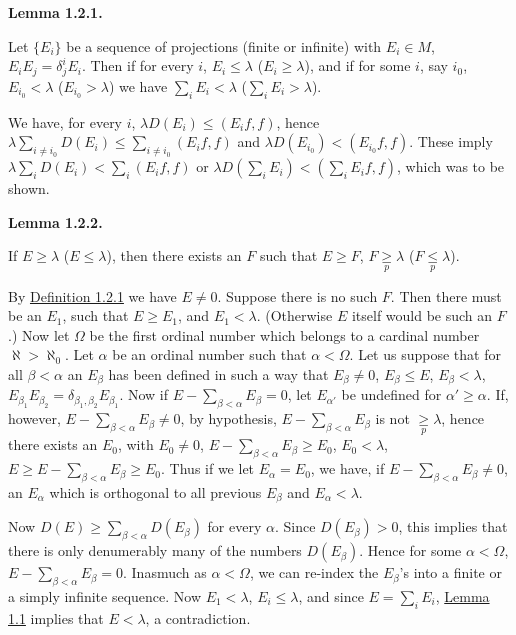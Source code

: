 \documentclass[twoside,leqno]{article}
\newcommand{\StatementTarget}[1]{\phantomsection\hypertarget{stmt:#1}{}}
\newcommand{\StatementRef}[2]{\hyperlink{stmt:#1}{#2}}
\newenvironment{statement}[2]{%
  \par\medskip
  \noindent\StatementTarget{#1}\hspace*{\parindent}\textbf{#2.}\ \itshape\ignorespaces
}{\par}
\begin{document}
\begin{statement}{lemma:1.2.1}{Lemma 1.2.1}
Let $\{E_i\}$ be a sequence of projections (finite or infinite) with
$E_i\in M$, $E_iE_j=\delta_j^iE_i$. Then if for every $i$, $E_i\leq\lambda$
($E_i\geq\lambda$), and if for some $i$, say $i_0$, $E_{i_0}<\lambda$
($E_{i_0}>\lambda$) we have $\sum_iE_i<\lambda$ ($\sum_iE_i>\lambda$).
\end{statement}

We have, for every $i$, $\lambda D(E_i)\leq(E_if,f)$, hence
$\lambda\sum_{i\ne i_0}D(E_i)\leq\sum_{i\ne i_0}(E_if,f)$ and
$\lambda D(E_{i_0})<(E_{i_0}f,f)$. These imply
$\lambda\sum_iD(E_i)<\sum_i(E_if,f)$ or
$\lambda D(\sum_iE_i)<(\sum_iE_if,f)$, which was to be shown.

\begin{statement}{lemma:1.2.2}{Lemma 1.2.2}
If $E\geq\lambda$ ($E\leq\lambda$), then there exists an $F$ such that
$E\geq F$, $F\mathrel{\underset p\geq}\lambda$ ($F\mathrel{\underset p\leq}\lambda$).
\end{statement}

By \StatementRef{definition:1.2.1}{Definition 1.2.1} we have $E\ne0$. Suppose there is no such $F$. Then there
must be an $E_1$, such that $E\geq E_1$, and $E_1<\lambda$. (Otherwise $E$ itself would be
such an $F$.) Now let $\Omega$ be the first ordinal number which belongs to a cardinal
number $\aleph>\aleph_0$. Let $\alpha$ be an ordinal number such that $\alpha<\Omega$. Let us suppose
that for all $\beta<\alpha$ an $E_\beta$ has been defined in such a way that $E_\beta\ne0$, $E_\beta\leq E$,
$E_\beta<\lambda$, $E_{\beta_1}E_{\beta_2}=\delta_{\beta_1,\beta_2}E_{\beta_1}$. Now if
$E-\sum_{\beta<\alpha}E_\beta=0$, let $E_{\alpha'}$ be undefined for $\alpha'\geq\alpha$. If, however,
$E-\sum_{\beta<\alpha}E_\beta\ne0$, by hypothesis, $E-\sum_{\beta<\alpha}E_\beta$ is not
$\mathrel{\underset p\geq}\lambda$, hence there exists an $E_0$, with $E_0\ne0$,
$E-\sum_{\beta<\alpha}E_\beta\geq E_0$, $E_0<\lambda$,
$E\geq E-\sum_{\beta<\alpha}E_\beta\geq E_0$. Thus if we let $E_\alpha=E_0$, we have, if
$E-\sum_{\beta<\alpha}E_\beta\ne0$, an $E_\alpha$ which is orthogonal to all previous $E_\beta$ and $E_\alpha<\lambda$.

Now $D(E)\geq\sum_{\beta<\alpha}D(E_\beta)$ for every $\alpha$. Since $D(E_\beta)>0$, this implies that
there is only denumerably many of the numbers $D(E_\beta)$. Hence for some
$\alpha<\Omega$, $E-\sum_{\beta<\alpha}E_\beta=0$. Inasmuch as $\alpha<\Omega$, we can re-index the $E_\beta$'s into a
finite or a simply infinite sequence. Now $E_1<\lambda$, $E_i\leq\lambda$, and since $E=\sum_iE_i$,
\StatementRef{lemma:1.2.1}{Lemma 1.1} implies that $E<\lambda$, a contradiction.
\end{document}
